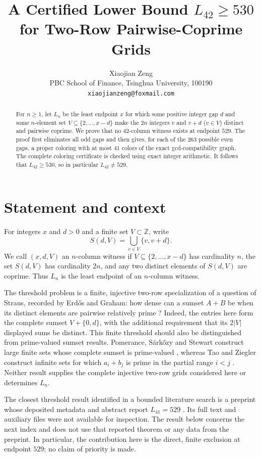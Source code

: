 \documentclass[11pt]{article}
\title{A Certified Lower Bound $L_{42}\geq 530$\\
for Two-Row Pairwise-Coprime Grids}
\author{Xiaojian Zeng\\
\small PBC School of Finance, Tsinghua University, 100190\\
\small \texttt{xiaojianzeng@foxmail.com}}
\date{}
\newcommand{\Z}{\mathbb Z}
\begin{document}
\maketitle

\begin{abstract}
For $n\geq1$, let $L_n$ be the least endpoint $x$ for which some positive
integer gap $d$ and some $n$-element set
$V\subseteq\{2,\ldots,x-d\}$ make the $2n$ integers $v$ and $v+d$
($v\in V$) distinct and pairwise coprime.  We prove that no $42$-column
witness exists at endpoint $529$.  The proof first eliminates all odd gaps
and then gives, for each of the $263$ possible even gaps, a proper coloring
with at most $41$ colors of the exact gcd-compatibility graph.  The complete
coloring certificate is checked using exact integer arithmetic.  It follows
that $L_{42}\geq530$, so in particular $L_{42}\ne529$.
\end{abstract}

\section{Statement and context}

For integers $x$ and $d>0$ and a finite set $V\subset\Z$, write
\[
 S(d,V)=\bigcup_{v\in V}\{v,v+d\}.
\]
We call $(x,d,V)$ an $n$-column witness if
$V\subseteq\{2,\ldots,x-d\}$ has cardinality $n$, the set $S(d,V)$ has
cardinality $2n$, and any two distinct elements of $S(d,V)$ are coprime.
Thus $L_n$ is the least endpoint of an $n$-column witness.

The threshold problem is a finite, injective two-row specialization of a
question of Straus, recorded by Erd\H{o}s and Graham: how dense can a sumset
$A+B$ be when its distinct elements are pairwise relatively prime
\cite[p.~85]{ErdosGraham1980}?  Indeed, the entries here form the complete
sumset $V+\{0,d\}$, with the additional requirement that its $2|V|$ displayed
sums be distinct.  This finite threshold should also be distinguished from
prime-valued sumset results.  Pomerance, S\'ark\H{o}zy and Stewart construct
large finite sets whose complete sumset is prime-valued
\cite[Theorem~6]{PomeranceSarkozyStewart1988}, whereas Tao and Ziegler construct
infinite sets for which $a_i+b_j$ is prime in the partial range $i<j$
\cite{TaoZiegler2023}.  Neither result supplies the complete injective
two-row grids considered here or determines $L_n$.

The closest threshold result identified in a bounded literature search is a
preprint whose deposited metadata and abstract report $L_{41}=529$
\cite{Zeng2026SSRN7395519}.  Its full text and auxiliary files were not
available for inspection.  The result below concerns the next index and does
not use that reported theorem or any data from the preprint.  In particular,
the contribution here is the direct, finite exclusion at endpoint $529$; no
claim of priority is made.
\end{document}
